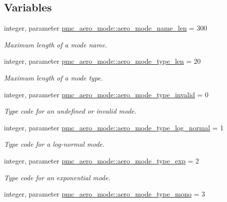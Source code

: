 \subsection*{Variables}
\begin{DoxyCompactItemize}
\item 
integer, parameter \mbox{\hyperlink{namespacepmc__aero__mode_ae84b8139739f7f4a21f52621b68f8b3b}{pmc\+\_\+aero\+\_\+mode\+::aero\+\_\+mode\+\_\+name\+\_\+len}} = 300
\begin{DoxyCompactList}\small\item\em Maximum length of a mode name. \end{DoxyCompactList}\item 
integer, parameter \mbox{\hyperlink{namespacepmc__aero__mode_a267ddc1551b2f71a22191d1c14577227}{pmc\+\_\+aero\+\_\+mode\+::aero\+\_\+mode\+\_\+type\+\_\+len}} = 20
\begin{DoxyCompactList}\small\item\em Maximum length of a mode type. \end{DoxyCompactList}\item 
integer, parameter \mbox{\hyperlink{namespacepmc__aero__mode_ae914213ae545288187869448e9a7c9c8}{pmc\+\_\+aero\+\_\+mode\+::aero\+\_\+mode\+\_\+type\+\_\+invalid}} = 0
\begin{DoxyCompactList}\small\item\em Type code for an undefined or invalid mode. \end{DoxyCompactList}\item 
integer, parameter \mbox{\hyperlink{namespacepmc__aero__mode_a936200d0b3116d7e58d32e7b43ac4789}{pmc\+\_\+aero\+\_\+mode\+::aero\+\_\+mode\+\_\+type\+\_\+log\+\_\+normal}} = 1
\begin{DoxyCompactList}\small\item\em Type code for a log-\/normal mode. \end{DoxyCompactList}\item 
integer, parameter \mbox{\hyperlink{namespacepmc__aero__mode_af8ac2864bbbcbbb395efddac6ae2ac7f}{pmc\+\_\+aero\+\_\+mode\+::aero\+\_\+mode\+\_\+type\+\_\+exp}} = 2
\begin{DoxyCompactList}\small\item\em Type code for an exponential mode. \end{DoxyCompactList}\item 
integer, parameter \mbox{\hyperlink{namespacepmc__aero__mode_a2a5e08b4bbed0947335c38a0a3791f6c}{pmc\+\_\+aero\+\_\+mode\+::aero\+\_\+mode\+\_\+type\+\_\+mono}} = 3

\end{DoxyCompactItemize}
